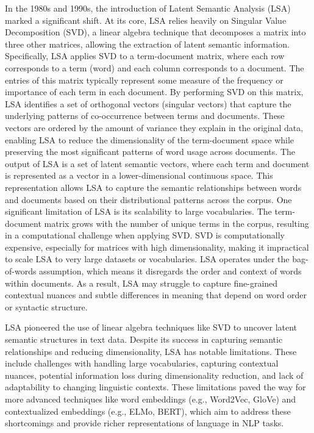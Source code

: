 In the 1980s and 1990s, the introduction of Latent Semantic Analysis (LSA) marked a significant shift. At its core, LSA relies heavily on Singular Value Decomposition (SVD), a linear algebra technique that decomposes a matrix into three other matrices, allowing the extraction of latent semantic information. Specifically, LSA applies SVD to a term-document matrix, where each row corresponds to a term (word) and each column corresponds to a document. The entries of this matrix typically represent some measure of the frequency or importance of each term in each document. By performing SVD on this matrix, LSA identifies a set of orthogonal vectors (singular vectors) that capture the underlying patterns of co-occurrence between terms and documents. These vectors are ordered by the amount of variance they explain in the original data, enabling LSA to reduce the dimensionality of the term-document space while preserving the most significant patterns of word usage across documents. The output of LSA is a set of latent semantic vectors, where each term and document is represented as a vector in a lower-dimensional continuous space. This representation allows LSA to capture the semantic relationships between words and documents based on their distributional patterns across the corpus. One significant limitation of LSA is its scalability to large vocabularies. The term-document matrix grows with the number of unique terms in the corpus, resulting in a computational challenge when applying SVD. SVD is computationally expensive, especially for matrices with high dimensionality, making it impractical to scale LSA to very large datasets or vocabularies. LSA operates under the bag-of-words assumption, which means it disregards the order and context of words within documents. As a result, LSA may struggle to capture fine-grained contextual nuances and subtle differences in meaning that depend on word order or syntactic structure.

LSA pioneered the use of linear algebra techniques like SVD to uncover latent semantic structures in text data. Despite its success in capturing semantic relationships and reducing dimensionality, LSA has notable limitations. These include challenges with handling large vocabularies, capturing contextual nuances, potential information loss during dimensionality reduction, and lack of adaptability to changing linguistic contexts. These limitations paved the way for more advanced techniques like word embeddings (e.g., Word2Vec, GloVe) and contextualized embeddings (e.g., ELMo, BERT), which aim to address these shortcomings and provide richer representations of language in NLP tasks.

